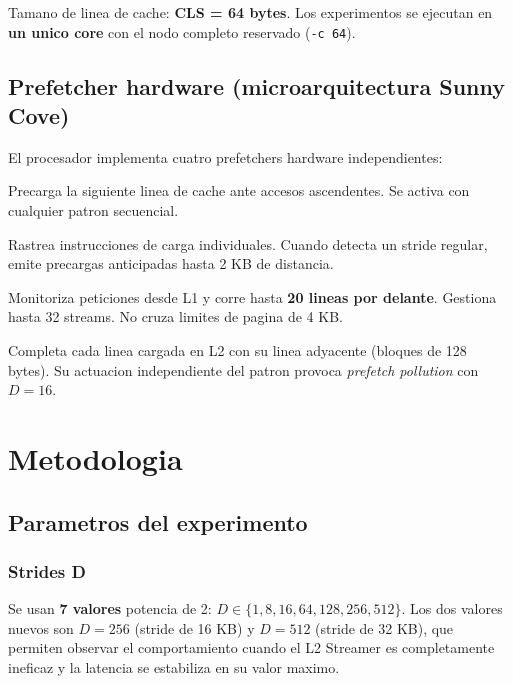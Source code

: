 \documentclass[12pt,a4paper]{article}
\begin{document}
Tamano de linea de cache: \textbf{CLS = 64 bytes}. Los experimentos se ejecutan en \textbf{un unico core} con el nodo completo reservado (\texttt{-c 64}).

\subsection{Prefetcher hardware (microarquitectura Sunny Cove)}

El procesador implementa cuatro prefetchers hardware independientes:

\begin{description}[leftmargin=1.5em]
  \item[DCU Streamer:] Precarga la siguiente linea de cache ante accesos ascendentes. Se activa con cualquier patron secuencial.
  \item[DCU IP Stride Prefetcher:] Rastrea instrucciones de carga individuales. Cuando detecta un stride regular, emite precargas anticipadas hasta 2 KB de distancia.
  \item[L2 Streamer:] Monitoriza peticiones desde L1 y corre hasta \textbf{20 lineas por delante}. Gestiona hasta 32 streams. No cruza limites de pagina de 4 KB.
  \item[L2 Spatial (Adjacent Cache Line):] Completa cada linea cargada en L2 con su linea adyacente (bloques de 128 bytes). Su actuacion independiente del patron provoca \emph{prefetch pollution} con $D=16$.
\end{description}

\section{Metodologia}

\subsection{Parametros del experimento}

\subsubsection*{Strides D}

Se usan \textbf{7 valores} potencia de 2: $D \in \{1, 8, 16, 64, 128, 256, 512\}$. Los dos valores nuevos son $D=256$ (stride de 16 KB) y $D=512$ (stride de 32 KB), que permiten observar el comportamiento cuando el L2 Streamer es completamente ineficaz y la latencia se estabiliza en su valor maximo.
\end{document}
